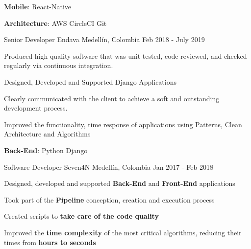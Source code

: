 \begin{cventries}
{\begin{cvitems}
        \item {\textbf{Mobile}: React-Native {\dotsep} }
        \item {\textbf{Architecture}: AWS {\dotsep}  {\dotsep} CircleCI {\dotsep}  {\dotsep} Git {\dotsep} }
      \end{cvitems}
      \begin{cvsubentries}
      \end{cvsubentries}
    }
  \cventry
    {Senior Developer}
    {Endava}
    {Medellín, Colombia}
    {Feb 2018 - July 2019}
    {
      \begin{cvitems}
        \item {Produced high-quality software that was unit tested, code reviewed, and checked regularly via continuous integration.}
        \item {Designed, Developed and Supported Django Applications}
        \item {Clearly communicated with the client to achieve a soft and outstanding development process.}
        \item {Improved the functionality, time response of applications using Patterns, Clean Architecture and Algorithms}
        \item {\textbf{Back-End}: Python {\dotsep}  {\dotsep} Django {\dotsep} }
      \end{cvitems}
      \begin{cvsubentries}
      \end{cvsubentries}
    }
  \cventry
    {Software Developer}
    {Seven4N}
    {Medellín, Colombia}
    {Jan 2017 - Feb 2018}
    {
      \begin{cvitems}
        \item {Designed, developed and supported \textbf{Back-End} and \textbf{Front-End} applications}
        \item {Took part of the \textbf{Pipeline} conception, creation and execution process}
        \item {Created scripts to \textbf{take care of the code quality}}
        \item {Improved the \textbf{time complexity} of the most critical algorithms, reducing their times from \textbf{hours to seconds}}

\end{cvitems}}
\end{cventries}
